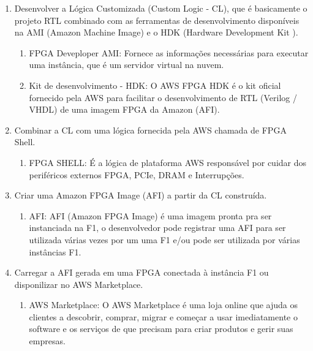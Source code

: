 \documentclass[conference]{IEEEtran}
\begin{document}
	\begin{enumerate}
		\item Desenvolver a Lógica Customizada (Custom Logic - CL), que é basicamente o projeto RTL combinado com as ferramentas de desenvolvimento disponíveis na AMI  (Amazon Machine Image) e o HDK (Hardware Development Kit ).
		\begin{enumerate}
			\item FPGA Deveploper
			AMI: Fornece as informações necessárias para executar uma instância, que é um servidor virtual na nuvem. 
			\item Kit de desenvolvimento - HDK: 
			O AWS FPGA HDK é o kit oficial fornecido pela AWS para facilitar o desenvolvimento de RTL (Verilog / VHDL) de uma imagem FPGA da Amazon (AFI).
		\end{enumerate}
		\item Combinar a CL com uma lógica fornecida pela AWS chamada de FPGA Shell.
			\begin{enumerate}
			\item FPGA SHELL: É a lógica de plataforma AWS responsável por cuidar dos periféricos externos FPGA, PCIe, DRAM e Interrupções.
		\end{enumerate}
		\item Criar uma Amazon FPGA Image (AFI) a partir da CL construída.
		\begin{enumerate}
			\item AFI: AFI (Amazon FPGA Image) é uma imagem pronta pra ser instanciada na F1, o desenvolvedor pode registrar uma AFI para ser utilizada várias vezes por um uma F1 e/ou pode ser utilizada por várias instâncias F1. 
		\end{enumerate}
		\item Carregar a AFI gerada em uma FPGA conectada à instância F1 ou disponilizar no AWS Marketplace.
		\begin{enumerate}
			\item AWS Marketplace: O AWS Marketplace é uma loja online que ajuda os clientes a descobrir, comprar, migrar e começar a usar imediatamente o software e os serviços de que precisam para criar produtos e gerir suas empresas.		
		\end{enumerate}
	\end{enumerate}
\end{document}
